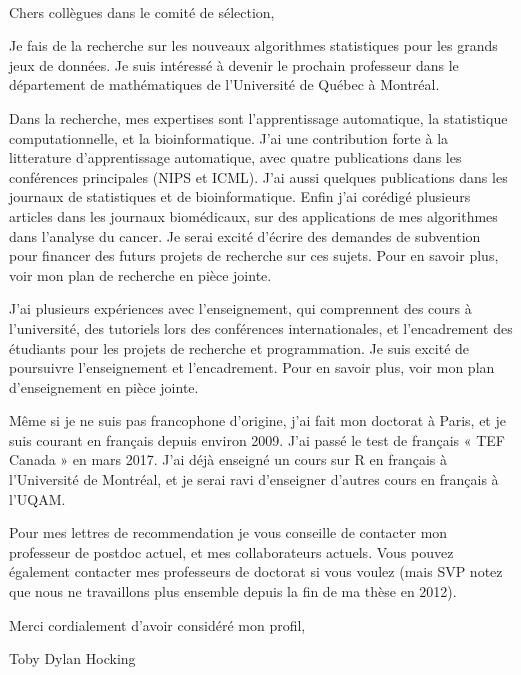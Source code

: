 \documentclass{article}
\begin{document}
\mbox{ }

Chers collègues dans le comité de sélection,

Je fais de la recherche sur les nouveaux algorithmes statistiques pour
les grands jeux de données. Je suis intéressé à devenir le prochain
professeur dans le département de mathématiques de l'Université de
Québec à Montréal.

Dans la recherche, mes expertises sont l'apprentissage automatique, la
statistique computationnelle, et la bioinformatique. J'ai une
contribution forte à la litterature d'apprentissage automatique, avec
quatre publications dans les conférences principales (NIPS et
ICML). J'ai aussi quelques publications dans les journaux de
statistiques et de bioinformatique. Enfin j'ai corédigé plusieurs
articles dans les journaux biomédicaux, sur des applications de mes
algorithmes dans l'analyse du cancer. Je serai excité d'écrire des
demandes de subvention pour financer des futurs projets de recherche
sur ces sujets. Pour en savoir plus, voir mon plan de recherche
en pièce jointe.
 
J'ai plusieurs expériences avec l'enseignement, qui comprennent des cours
à l'université, des tutoriels lors des conférences internationales, et
l'encadrement des étudiants pour les projets de recherche et
programmation. Je suis excité de poursuivre l'enseignement et l'encadrement. Pour en savoir plus, voir mon plan d'enseignement en pièce jointe.

Même si je ne suis pas francophone d'origine, j'ai fait mon doctorat à
Paris, et je suis courant en français depuis environ 2009. J'ai passé
le test de français « TEF Canada » en mars 2017. J'ai déjà enseigné un
cours sur R en français à l'Université de Montréal, et je serai ravi
d'enseigner d'autres cours en français à l'UQAM.

Pour mes lettres de recommendation je vous conseille de contacter mon
professeur de postdoc actuel, et mes collaborateurs actuels. Vous
pouvez également contacter mes professeurs de doctorat si vous voulez
(mais SVP notez que nous ne travaillons plus ensemble depuis la fin de
ma thèse en 2012).

Merci cordialement d'avoir considéré mon profil, 

Toby Dylan Hocking
\end{document}
